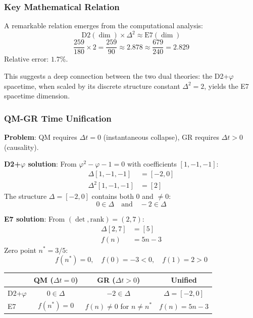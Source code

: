 \documentclass[11pt,a4paper]{article}
\begin{document}
\subsubsection{Key Mathematical Relation}

A remarkable relation emerges from the computational analysis:
\begin{equation}
\text{D2}(\dim) \times \Delta^2 \approx \text{E7}(\dim)
\end{equation}
\begin{equation}
\frac{259}{180} \times 2 = \frac{259}{90} \approx 2.878 \approx \frac{679}{240} = 2.829
\end{equation}
Relative error: $1.7\%$.

This suggests a deep connection between the two dual theories: the D2+$\varphi$ spacetime, when scaled by its discrete structure constant $\Delta^2 = 2$, yields the E7 spacetime dimension.

\subsubsection{QM-GR Time Unification}

\textbf{Problem}: QM requires $\Delta t = 0$ (instantaneous collapse), GR requires $\Delta t > 0$ (causality).

\textbf{D2+$\varphi$ solution}: From $\varphi^2 - \varphi - 1 = 0$ with coefficients $[1, -1, -1]$:
\begin{align}
\Delta[1, -1, -1] &= [-2, 0] \\
\Delta^2[1, -1, -1] &= [2]
\end{align}
The structure $\Delta = [-2, 0]$ contains both $0$ and $\neq 0$:
\begin{equation}
0 \in \Delta \quad \text{and} \quad -2 \in \Delta
\end{equation}

\textbf{E7 solution}: From $(\det, \text{rank}) = (2, 7)$:
\begin{align}
\Delta[2, 7] &= [5] \\
f(n) &= 5n - 3
\end{align}
Zero point $n^* = 3/5$:
\begin{equation}
f(n^*) = 0, \quad f(0) = -3 < 0, \quad f(1) = 2 > 0
\end{equation}

\begin{center}
\begin{tabular}{|l|c|c|c|}
\hline
& \textbf{QM} ($\Delta t = 0$) & \textbf{GR} ($\Delta t > 0$) & \textbf{Unified} \\
\hline
D2+$\varphi$ & $0 \in \Delta$ & $-2 \in \Delta$ & $\Delta = [-2, 0]$ \\
E7 & $f(n^*) = 0$ & $f(n) \neq 0$ for $n \neq n^*$ & $f(n) = 5n - 3$ \\
\hline
\end{tabular}
\end{center}
\end{document}

